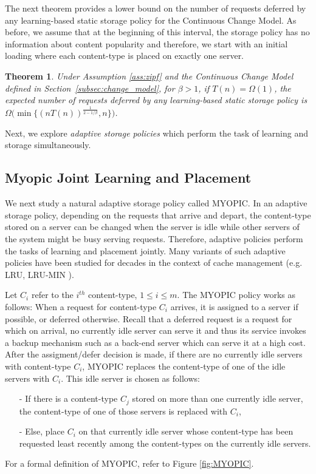 \documentclass[10pt, conference, letterpaper]{IEEEtran}
\newtheorem{theorem}{Theorem}
\begin{document}
The next theorem provides a lower bound on the number of requests deferred by any learning-based static storage policy for the Continuous Change Model.  As before, we assume that at the beginning of this interval, the storage policy has no information about content popularity and therefore, we start with an initial loading where each content-type is placed on exactly one server.

\begin{theorem}
	\label{thm:converse_2}
	Under Assumption \ref{ass:zipf} and the Continuous Change Model defined in
	Section~\ref{subsec:change_model}, for $\beta > 1$, if $T(n) =
	\Omega(1)$, the expected number
	of requests deferred by any learning-based static storage policy is
	$\Omega\big(\min\{(nT(n))^{\frac{1}{2-1/\beta}},n\}\big)$.
\end{theorem}



Next, we explore \textit{adaptive storage policies} which perform the
task of learning and storage simultaneously.


\subsection{Myopic Joint Learning and Placement}
\label{subsec:MYOPIC}
We next study a natural adaptive storage policy called MYOPIC. In an
adaptive storage policy, depending on the requests that arrive and
depart, the content-type stored on a server can be changed when the server
is idle while other servers of the system might be busy serving
requests. Therefore, adaptive policies perform the tasks of learning
and placement jointly. Many variants of such adaptive policies have
been studied for decades in the context of cache management (e.g. LRU,
LRU-MIN \cite{LRU-MIN95}).


Let $C_i$ refer to the $i^{th}$ content-type, $1 \leq i \leq m$. The
MYOPIC policy works as follows: When a request for content-type $C_i$
arrives, it is assigned to a server if possible, or deferred
otherwise. Recall that a deferred request is a request for which on
arrival, no currently idle server can serve it and thus its service
invokes a backup mechanism such as a back-end server which can serve
it at a high cost. After the assigment/defer decision is made, if
there are no currently idle servers with content-type $C_i$, MYOPIC
replaces the content-type of one of the idle servers with $C_i$. This idle
server is chosen as follows:
\begin{itemize}
	\item[-] If there is a content-type $C_j$ stored on more than one currently
	idle server, the content-type of one of those servers is replaced with
	$C_i$,
	\item[-] Else, place $C_i$ on that currently idle server whose content-type
	has been requested least recently among the content-types on the
	currently idle servers.
\end{itemize}
\noindent For a formal definition of MYOPIC, refer to Figure \ref{fig:MYOPIC}.\\
\end{document}
